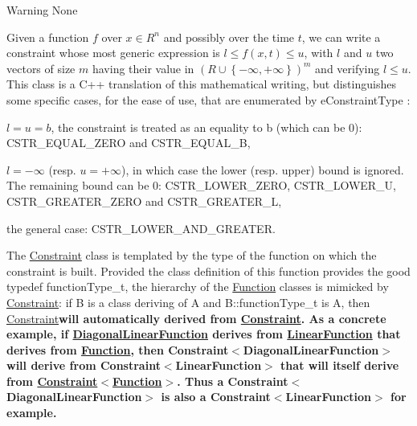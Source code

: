 \begin{DoxyWarning}{Warning}
None
\end{DoxyWarning}
Given a function $ f $ over $ x \in R^n $ and possibly over the time $ t $, we can write a constraint whose most generic expression is $ l \le f(x,t) \le u $, with $ l $ and $ u $ two vectors of size $ m $ having their value in $ \left(R\cup\left\{-\infty,+\infty\right\}\right)^m $ and verifying $ l \le u $. This class is a C++ translation of this mathematical writing, but distinguishes some specific cases, for the ease of use, that are enumerated by e\+Constraint\+Type \+:
\begin{DoxyItemize}
\item $ l = u = b $, the constraint is treated as an equality to b (which can be 0)\+: C\+S\+T\+R\+\_\+\+E\+Q\+U\+A\+L\+\_\+\+Z\+E\+RO and C\+S\+T\+R\+\_\+\+E\+Q\+U\+A\+L\+\_\+B,
\item $ l = -\infty $ (resp. $ u = +\infty $), in which case the lower (resp. upper) bound is ignored. The remaining bound can be 0\+: C\+S\+T\+R\+\_\+\+L\+O\+W\+E\+R\+\_\+\+Z\+E\+RO, C\+S\+T\+R\+\_\+\+L\+O\+W\+E\+R\+\_\+U, C\+S\+T\+R\+\_\+\+G\+R\+E\+A\+T\+E\+R\+\_\+\+Z\+E\+RO and C\+S\+T\+R\+\_\+\+G\+R\+E\+A\+T\+E\+R\+\_\+L,
\item the general case\+: C\+S\+T\+R\+\_\+\+L\+O\+W\+E\+R\+\_\+\+A\+N\+D\+\_\+\+G\+R\+E\+A\+T\+ER.
\end{DoxyItemize}

The \hyperlink{classocra_1_1Constraint}{Constraint} class is templated by the type of the function on which the constraint is built. Provided the class definition of this function provides the good typedef function\+Type\+\_\+t, the hierarchy of the \hyperlink{classocra_1_1Function}{Function} classes is mimicked by \hyperlink{classocra_1_1Constraint}{Constraint}\+: if B is a class deriving of A and B\+::function\+Type\+\_\+t is A, then \hyperlink{classocra_1_1Constraint}{Constraint}{\bfseries  will automatically derived from \hyperlink{classocra_1_1Constraint}{Constraint}. As a concrete example, if \hyperlink{classocra_1_1DiagonalLinearFunction}{Diagonal\+Linear\+Function} derives from \hyperlink{classocra_1_1LinearFunction}{Linear\+Function} that derives from \hyperlink{classocra_1_1Function}{Function}, then Constraint$<$\+Diagonal\+Linear\+Function$>$ will derive from Constraint$<$\+Linear\+Function$>$ that will itself derive from \hyperlink{classocra_1_1Constraint_3_01Function_01_4}{Constraint$<$\+Function$>$}. Thus a Constraint$<$\+Diagonal\+Linear\+Function$>$ is also a Constraint$<$\+Linear\+Function$>$ for example.}

